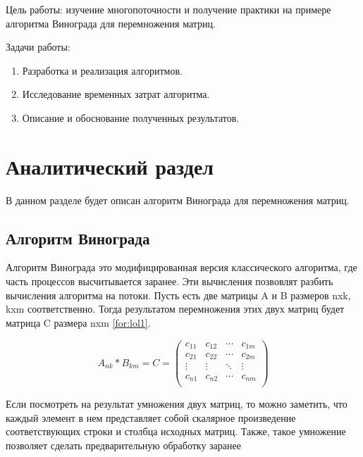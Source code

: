\documentclass[12pt, a4paper]{report}
\begin{document}
		\vspace{0.3cm}Цель работы: изучение многопоточности и получение практики на примере алгоритма Винограда для перемножения матриц.
	
		\vspace{0.3cm}Задачи работы:
	\begin{enumerate}
		\item Разработка и реализация алгоритмов.
		\item Исследование временных затрат алгоритма.
		\item Описание и обоснование полученных результатов.
	\end{enumerate}
	

    \chapter{Аналитический раздел}
    
   	\vspace{-0.5cm}\hspace{0.6cm}В данном разделе будет описан алгоритм Винограда для перемножения матриц.
   	
   	
	\section{Алгоритм Винограда}
	
	Алгоритм Винограда это модифицированная версия классического алгоритма, где часть процессов высчитывается заранее. Эти вычисления позвовлят разбить вычисления алгоритма на потоки. Пусть есть две матрицы A и B размеров nxk, kxm соответственно. Тогда результатом перемножения этих двух матриц будет матрица C размера nxm \ref{for:lol1}.
	
	\begin{equation}
	A_{nk} * B_{km} = C = \begin{pmatrix}
		c_{11} & c_{12} & \cdots & c_{1m} \\
		c_{21} & c_{22} & \cdots & c_{2m} \\         
		\vdots & \vdots & \ddots & \vdots \\
		c_{n1} & c_{n2} & \cdots & c_{nm} \\
	\end{pmatrix}
	\label{for:lol1}
	\end{equation}
	
	Если посмотреть на результат умножения двух матриц, то можно заметить, что каждый элемент в нем представляет собой скалярное произведение соответствующих строки и столбца исходных матриц. Также, такое умножение позволяет сделать предварительную обработку заранее \cite{Volkova}
	
\end{document}
